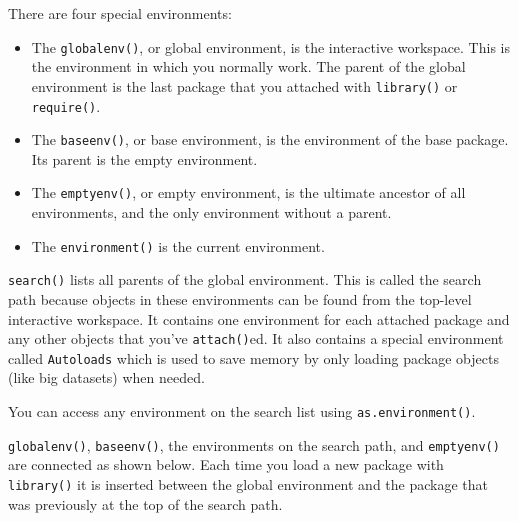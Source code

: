 There are four special environments:

\begin{itemize}
\item
  The \texttt{globalenv()}, or global environment, is the interactive
  workspace. This is the environment in which you normally work. The
  parent of the global environment is the last package that you attached
  with \texttt{library()} or \texttt{require()}.
\item
  The \texttt{baseenv()}, or base environment, is the environment of the
  base package. Its parent is the empty environment.
\item
  The \texttt{emptyenv()}, or empty environment, is the ultimate
  ancestor of all environments, and the only environment without a
  parent.
\item
  The \texttt{environment()} is the current environment.
\end{itemize}

\texttt{search()} lists all parents of the global environment. This is
called the search path because objects in these environments can be
found from the top-level interactive workspace. It contains one
environment for each attached package and any other objects that you've
\texttt{attach()}ed. It also contains a special environment called
\texttt{Autoloads} which is used to save memory by only loading package
objects (like big datasets) when needed. 

You can access any environment on the search list using
\texttt{as.environment()}.

\begin{Shaded}
\begin{Highlighting}[]
\NormalTok{()}

\NormalTok{(}\NormalTok{)}
\end{Highlighting}
\end{Shaded}

\texttt{globalenv()}, \texttt{baseenv()}, the environments on the search
path, and \texttt{emptyenv()} are connected as shown below. Each time
you load a new package with \texttt{library()} it is inserted between
the global environment and the package that was previously at the top of
the search path.

